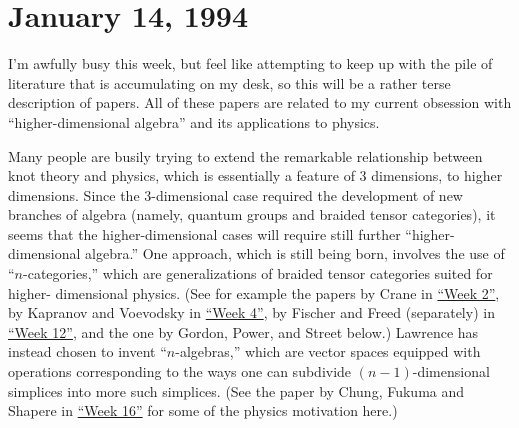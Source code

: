 \documentclass[12pt]{article}
\renewcommand{\texttt}[1]{%
  \begingroup
  \ttfamily
  \begingroup\lccode`~=`/\lowercase{\endgroup\def~}{/\discretionary{}{}{}}%
  \begingroup\lccode`~=`[\lowercase{\endgroup\def~}{[\discretionary{}{}{}}%
  \begingroup\lccode`~=`.\lowercase{\endgroup\def~}{.\discretionary{}{}{}}%
  \catcode`/=\active\catcode`[=\active\catcode`.=\active
  \scantokens{#1\noexpand}%
  \endgroup
}
\begin{document}
\hypertarget{week29}{%
\section{January 14, 1994}\label{week29}}

I'm awfully busy this week, but feel like attempting to keep up with the
pile of literature that is accumulating on my desk, so this will be a
rather terse description of papers. All of these papers are related to
my current obsession with ``higher-dimensional algebra'' and its
applications to physics.


Many people are busily trying to extend the remarkable relationship
between knot theory and physics, which is essentially a feature of 3
dimensions, to higher dimensions. Since the \(3\)-dimensional case
required the development of new branches of algebra (namely, quantum
groups and braided tensor categories), it seems that the
higher-dimensional cases will require still further ``higher-dimensional
algebra.'' One approach, which is still being born, involves the use of
``\(n\)-categories,'' which are generalizations of braided tensor
categories suited for higher- dimensional physics. (See for example the
papers by Crane in \protect\hyperlink{week2}{``Week 2''}, by Kapranov
and Voevodsky in \protect\hyperlink{week4}{``Week 4''}, by Fischer and
Freed (separately) in \protect\hyperlink{week12}{``Week 12''}, and the
one by Gordon, Power, and Street below.) Lawrence has instead chosen to
invent ``\(n\)-algebras,'' which are vector spaces equipped with
operations corresponding to the ways one can subdivide
\((n-1)\)-dimensional simplices into more such simplices. (See the paper
by Chung, Fukuma and Shapere in \protect\hyperlink{week16}{``Week 16''}
for some of the physics motivation here.)
\end{document}
